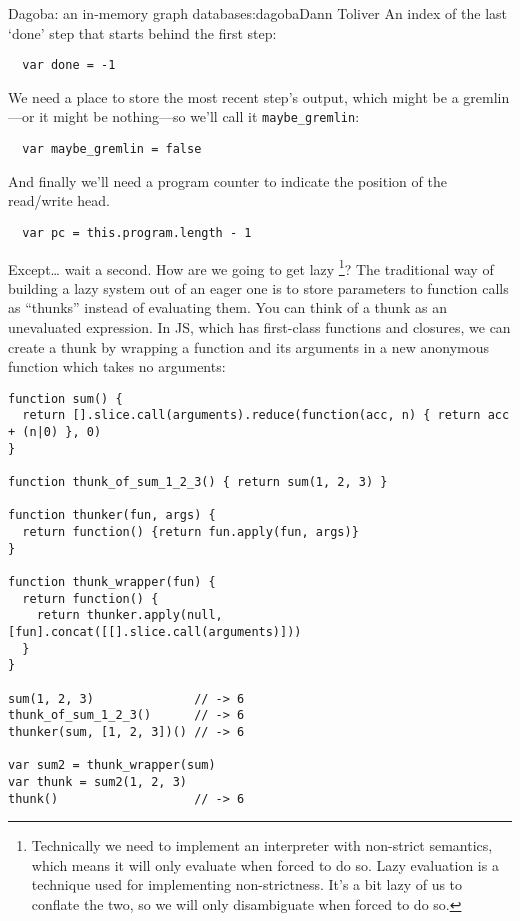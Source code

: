 \begin{aosachapter}{Dagoba: an in-memory graph database}{s:dagoba}{Dann Toliver}
An index of the last `done' step that starts behind the first step:

\begin{verbatim}
  var done = -1
\end{verbatim}

We need a place to store the most recent step's output, which might be a
gremlin---or it might be nothing---so we'll call it
\texttt{maybe\_gremlin}:

\begin{verbatim}
  var maybe_gremlin = false
\end{verbatim}

And finally we'll need a program counter to indicate the position of the
read/write head.

\begin{verbatim}
  var pc = this.program.length - 1
\end{verbatim}

Except\ldots{} wait a second. How are we going to get lazy \footnote{Technically
  we need to implement an interpreter with non-strict semantics, which
  means it will only evaluate when forced to do so. Lazy evaluation is a
  technique used for implementing non-strictness. It's a bit lazy of us
  to conflate the two, so we will only disambiguate when forced to do
  so.}? The traditional way of building a lazy system out of an eager
one is to store parameters to function calls as ``thunks'' instead of
evaluating them. You can think of a thunk as an unevaluated expression.
In JS, which has first-class functions and closures, we can create a
thunk by wrapping a function and its arguments in a new anonymous
function which takes no arguments:

\begin{verbatim}
function sum() {
  return [].slice.call(arguments).reduce(function(acc, n) { return acc + (n|0) }, 0)
}

function thunk_of_sum_1_2_3() { return sum(1, 2, 3) }

function thunker(fun, args) {
  return function() {return fun.apply(fun, args)}
}

function thunk_wrapper(fun) {
  return function() {
    return thunker.apply(null, [fun].concat([[].slice.call(arguments)]))
  }
}

sum(1, 2, 3)              // -> 6
thunk_of_sum_1_2_3()      // -> 6
thunker(sum, [1, 2, 3])() // -> 6

var sum2 = thunk_wrapper(sum)
var thunk = sum2(1, 2, 3)
thunk()                   // -> 6
\end{verbatim}


\end{aosachapter}
